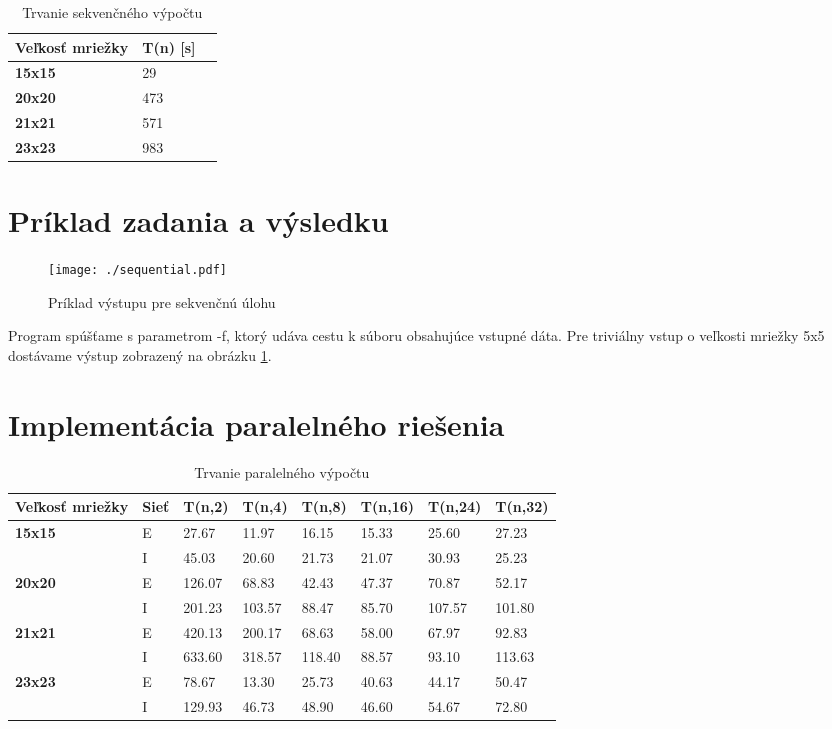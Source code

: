 \documentclass[slovak]{article}
\begin{document}
	\begin{table}\centering
		\begin{tabularx}{\textwidth}{|X|X|X|}
			\hline                        
			\textbf{Veľkosť mriežky} & \textbf{T(n) [s]} \\ \hline
			\textbf{15x15} 	& 29 \\ \hline
			\textbf{20x20} 	& 473 \\ \hline
			\textbf{21x21} 	& 571 \\ \hline
			\textbf{23x23} 	& 983 \\ \hline
		\end{tabularx}
	\caption{Trvanie sekvenčného výpočtu}
	\label{tab:sek}
	\end{table}

\section{Príklad zadania a výsledku}

	\begin{figure}\centering
	\texttt{[image: ./sequential.pdf]}
	\caption{Príklad výstupu pre sekvenčnú úlohu}\label{fig:sek}
	\end{figure}

Program spúšťame s parametrom -f, ktorý udáva cestu k súboru obsahujúce vstupné dáta. Pre triviálny vstup o veľkosti mriežky 5x5 dostávame výstup zobrazený na obrázku \ref{fig:sek}.

\section{Implementácia paralelného riešenia}

	\begin{table}\centering
		\begin{tabularx}{\textwidth}{|X|X|X|X|X|X|X|X|}
			\hline                        
			\textbf{Veľkosť mriežky} & \textbf{Sieť} & \textbf{T(n,2)} & \textbf{T(n,4)} & \textbf{T(n,8)} & \textbf{T(n,16)} & \textbf{T(n,24)} & \textbf{T(n,32)} \\ \hline
			\multirow{2}{*}{\textbf{15x15}} & E 	& 27.67 & 11.97 & 16.15 & 15.33 & 25.60 & 27.23 \\ \cline{2-8}
			\textbf & I & 45.03 & 20.60 & 21.73 & 21.07 & 30.93 & 25.23  \\ \hline
			\multirow{2}{*}{\textbf{20x20}} & E 	& 126.07 & 68.83 & 42.43 & 47.37 & 70.87 & 52.17 \\ \cline{2-8}
			\textbf & I & 201.23 & 103.57 & 88.47 & 85.70 & 107.57 & 101.80  \\ \hline
			\multirow{2}{*}{\textbf{21x21}} & E 	& 420.13 & 200.17 & 68.63 & 58.00 & 67.97 & 92.83  \\ \cline{2-8}
			\textbf & I & 633.60 & 318.57 & 118.40 & 88.57 & 93.10 & 113.63  \\ \hline
			\multirow{2}{*}{\textbf{23x23}} & E 	& 78.67 & 13.30 & 25.73 & 40.63 & 44.17 & 50.47  \\ \cline{2-8}
			\textbf & I & 129.93 & 46.73 & 48.90 & 46.60 & 54.67 & 72.80  \\ \hline
		\end{tabularx}
	\caption{Trvanie paralelného výpočtu}
	\label{tab:par}
	\end{table}
\end{document}
